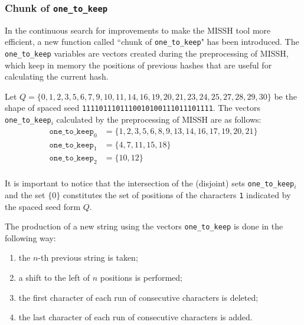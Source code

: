 \subsubsection*{Chunk of \texttt{one\_to\_keep}}
{
	\sloppy
	In the continuous search for improvements to make the MISSH tool more efficient, a new function called “chunk of \verb|one_to_keep|" has been introduced. The \verb|one_to_keep| variables are vectors created during the preprocessing of MISSH, which keep in memory the positions of previous hashes that are useful for calculating the current hash.

}

\begin{example}
	Let $Q = \{0, 1, 2, 3, 5, 6, 7, 9, 10, 11, 14, 16, 19, 20, 21, 23, 24, 25, 27, 28, 29, 30 \}$ be the shape of spaced seed \texttt{1111011101110010100111011101111}. The vectors \verb|one_to_keep|$_i$ calculated by the preprocessing of MISSH are as follows: \begin{align*}
		\texttt{one\_to\_keep}_0 &= \{ 1, 2, 3, 5, 6, 8, 9, 13, 14, 16, 17, 19, 20, 21 \} \\
		\texttt{one\_to\_keep}_1 &= \{ 4, 7, 11, 15, 18 \} \\
		\texttt{one\_to\_keep}_2 &= \{ 10, 12 \} \\
	\end{align*}
	
	It is important to notice that the intersection of the (disjoint) sets \verb|one_to_keep|$_i$ and the set $\{ 0 \}$ constitutes the set of positions of the characters \texttt{1} indicated by the spaced seed form $Q$.
\end{example}

The production of a new string using the vectors \verb|one_to_keep| is done in the following way:
\begin{enumerate}
	\item the $n$-th previous string is taken;
	\item a shift to the left of $n$ positions is performed;
	\item the first character of each run of consecutive characters is deleted;
	\item the last character of each run of consecutive characters is added.
\end{enumerate}

